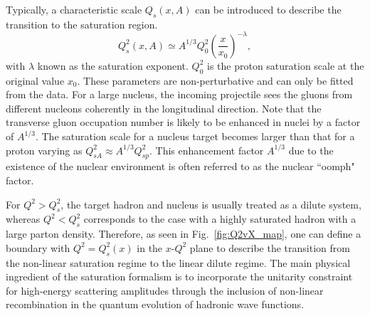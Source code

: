 Typically, a characteristic scale $Q_{s}(x,A)$ can
be introduced to describe the transition to the saturation region. 
\begin{equation}
Q^{2}_{s}(x,A)\simeq A^{1/3} Q^{2}_{0}(\frac{x}{x_{0}})^{-\lambda},
\label{eqn:sat_scale}
\end{equation}
with $\lambda$ known as the saturation exponent. $Q^{2}_{0}$ is the proton
saturation scale at the original value $x_{0}$. These parameters are
non-perturbative and can only be fitted from the data. 
For a large nucleus, the incoming projectile sees the gluons from different nucleons coherently in the longitudinal direction. Note that the transverse gluon occupation number is likely to be enhanced in nuclei by a factor of $A^{1/3}$.
The saturation scale for a nucleus target becomes larger than that for a proton varying as
$Q_{sA}^{2}\approx A^{1/3}Q^{2}_{sp}$. This enhancement factor $A^{1/3}$ due to
the existence of the nuclear environment is often referred to as the nuclear
``oomph" factor.

For $Q^{2}>Q_{s}^{2}$, the target hadron and nucleus is usually treated as a dilute system,
whereas $Q^{2}<Q_{s}^{2}$ corresponds to the case with a highly saturated
hadron with a large parton density. Therefore, as seen in
Fig.~\ref{fig:Q2vX_map}, one can define a boundary with $Q^2=Q_s^2(x)$ in the
$x\textrm{-}Q^2$ plane to describe the transition from the non-linear saturation
regime to the linear dilute regime. The main physical ingredient of the
saturation formalism is to incorporate the unitarity constraint for high-energy
scattering amplitudes through the inclusion of non-linear recombination in the
quantum evolution of hadronic wave functions.


